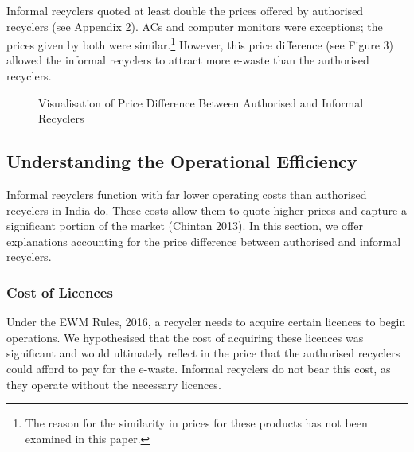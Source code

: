 \documentclass[a4paper, 12pt]{article}
\begin{document}
                     Informal recyclers quoted at least double the prices offered by authorised recyclers (see Appendix 2). ACs and computer monitors were exceptions; the prices given by both were similar.\footnote{The reason for the similarity in prices for these products has not been examined in this paper.} However, this price difference (see Figure 3) allowed the informal recyclers to attract more e-waste than the authorised recyclers. \\
                                        
                    \begin{figure}[H]
                    \centering
                    \caption[Optional Caption]{Visualisation of Price Difference Between Authorised and Informal Recyclers}
                    \end{figure}
                    
                    \subsection{Understanding the Operational Efficiency}
                    
                    Informal recyclers function with far lower operating costs than authorised recyclers in India do. These costs allow them to quote higher prices and capture a significant portion of the market (Chintan 2013). In this section, we offer explanations accounting for the price difference between authorised and informal recyclers. \\
                    
                    \subsubsection{Cost of Licences}
                    
                    Under the EWM Rules, 2016, a recycler needs to acquire certain licences to begin operations. We hypothesised that the cost of acquiring these licences was significant and would ultimately reflect in the price that the authorised recyclers could afford to pay for the e-waste. Informal recyclers do not bear this cost, as they operate without the necessary licences. \\
                    
\end{document}
